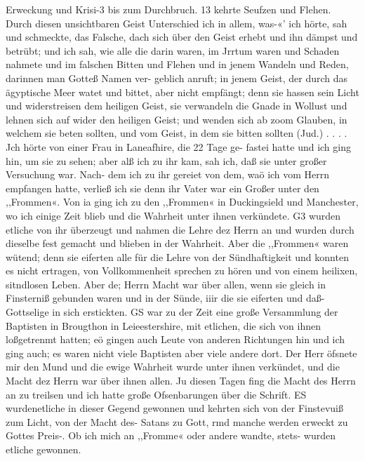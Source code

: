 Erweckung und Krisi-3 bis zum Durchbruch. 13
kehrte Seufzen und Flehen. Durch diesen unsichtbaren Geist
Unterschied ich in allem, was-«’ ich hörte, sah und schmeckte, das
Falsche, dach sich über den Geist erhebt und ihn dämpst und
betrübt; und ich sah, wie alle die darin waren, im Jrrtum waren
und Schaden nahmete und im falschen Bitten und Flehen und in
jenem Wandeln und Reden, darinnen man Gotteß Namen ver-
geblich anruft; in jenem Geist, der durch das ägyptische Meer
watet und bittet, aber nicht empfängt; denn sie hassen sein
Licht und widerstreisen dem heiligen Geist, sie verwandeln die
Gnade in Wollust und lehnen sich auf wider den heiligen Geist;
und wenden sich ab zoom Glauben, in welchem sie beten sollten,
und vom Geist, in dem sie bitten sollten (Jud.) . . . .
Jch hörte von einer Frau in Laneafhire, die 22 Tage ge-
fastei hatte und ich ging hin, um sie zu sehen; aber alß ich zu
ihr kam, sah ich, daß sie unter großer Versuchung war. Nach-
dem ich zu ihr gereiet von dem, waö ich vom Herrn empfangen
hatte, verließ ich sie denn ihr Vater war ein Großer unter den
,,Frommen«. Von ia ging ich zu den ,,Frommen« in Duckingsield
und Manchester, wo ich einige Zeit blieb und die Wahrheit unter
ihnen verkündete. G3 wurden etliche von ihr überzeugt und nahmen
die Lehre dez Herrn an und wurden durch dieselbe fest gemacht und
blieben in der Wahrheit. Aber die ,,Frommen« waren wütend;
denn sie eiferten alle für die Lehre von der Sündhaftigkeit und
konnten es nicht ertragen, von Vollkommenheit sprechen zu hören
und von einem heilixen, sitndlosen Leben. Aber de; Herrn Macht
war über allen, wenn sie gleich in Finsterniß gebunden waren
und in der Sünde, iiir die sie eiferten und daß- Gottselige in sich
erstickten. GS war zu der Zeit eine große Versammlung der
Baptisten in Brougthon in Leieestershire, mit etlichen, die sich
von ihnen loßgetrenmt hatten; eö gingen auch Leute von anderen
Richtungen hin und ich ging auch; es waren nicht viele Baptisten
aber viele andere dort. Der Herr öfsnete mir den Mund und
die ewige Wahrheit wurde unter ihnen verkündet, und die Macht
dez Herrn war über ihnen allen. Ju diesen Tagen fing die Macht
des Herrn an zu treilsen und ich hatte große Ofsenbarungen über die
Schrift. ES wurdenetliche in dieser Gegend gewonnen und kehrten
sich von der Finstevuiß zum Licht, von der Macht des- Satans zu
Gott, rmd manche werden erweckt zu Gottes Preis-. Ob ich mich an
,,Fromme« oder andere wandte, stets- wurden etliche gewonnen.


